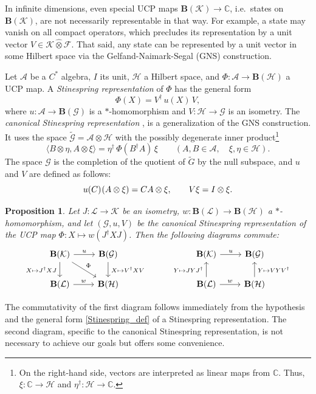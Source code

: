 \documentclass[12pt]{article}
\newcommand{\CC}{\mathbb{C}}
\newcommand{\calA}{\mathcal{A}}
\newcommand{\calF}{\mathcal{F}}
\newcommand{\calG}{\mathcal{G}}
\newcommand{\calH}{\mathcal{H}}
\newcommand{\calK}{\mathcal{K}}
\newcommand{\calL}{\mathcal{L}}
\newcommand{\ts}{\mkern1mu}
\newcommand{\hotimes}{\mathbin{\hat{\otimes}}}
\newcommand{\Bo}{\mathbf{B}}
\newcommand{\wt}{\widetilde}
\newcommand*{\braket}[2]{\langle{#1},{#2}\rangle}
\newtheorem{Proposition}[Theorem]{Proposition}
\newtheorem[definition]{Definition}[Theorem]{Definition}
\newtheorem[remark]{Example}[Theorem]{Example}
\newtheorem[remark]{Remark}[Theorem]{Remark}
\newtheorem[remark]{Question}[Theorem]{Open question}
\newtheorem*[definition]{definition}{Definition}
\newtheorem*[remark]{example}{Example}
\newtheorem*[remark]{remark}{Remark}
\newtheorem*[remark]{question}{Open question}
\numberwithin{equation}{section}
\begin{document}
In infinite dimensions, even special UCP maps $\Bo(\calK)\to\CC$, i.e.\ states on $\Bo(\calK)$, are not necessarily representable in that way. For example, a state may vanish on all compact operators, which precludes its representation by a unit vector $V\in\calK\hotimes\calF$. That said, any state can be represented by a unit vector in some Hilbert space via the Gelfand-Naimark-Segal (GNS) construction.

Let $\calA$ be a $C^*$ algebra, $I$ its unit, $\calH$ a Hilbert space, and $\Phi\colon\calA\to\Bo(\calH)$ a UCP map. A \emph{Stinespring representation} of $\Phi$ has the general form
\begin{equation}\label{Stinespring_def}
\Phi(X)=V^\dag\, u(X)\, V,
\end{equation}
where $u\colon\calA\to\Bo(\calG)$ is a $*$-homomorphism and $V\colon\calH\to\calG$ is an isometry. The \emph{canonical Stinespring representation} \cite{Sti55}, \cite[Theorem~4.1]{Paulsen} is a generalization of the GNS construction. It uses the space $\wt{\calG}=\calA\otimes\calH$ with the possibly degenerate inner product\footnote{On the right-hand side, vectors are interpreted as linear maps from $\CC$. Thus, $\xi\colon\CC\to\calH$ and $\eta^\dag\colon\calH\to\CC$.}
\begin{equation}
\braket{B\otimes\eta}{A\otimes\xi}=\eta^\dag\,\Phi(B^\dag A)\,\xi\qquad
(A,B\in\calA,\quad \xi,\eta\in\calH).
\end{equation}
The space $\calG$ is the completion of the quotient of $\wt{G}$ by the null subspace, and $u$ and $V$ are defined as follows:
\begin{equation}
u(C)\ts(A\otimes\xi)=CA\otimes\xi,\qquad V\xi=I\otimes\xi.
\end{equation}

\begin{Proposition}\label{prop_KLHG}
Let $J\colon\calL\to\calK$ be an isometry, $w\colon\Bo(\calL)\to\Bo(\calH)$ a $*$-homomorphism, and let $(\calG,u,V)$ be the canonical Stinespring representation of the UCP map $\Phi\colon X\mapsto w(J^\dag XJ)$. Then the following diagrams commute:
\begin{equation}
\begin{tikzcd}
\Bo(\calK) \arrow[d,swap,"X\mapsto J^\dag XJ\,"]
\arrow[r,"u"] \arrow[dr,"\Phi"] &
\Bo(\calG) \arrow[d,"\,X\mapsto V^\dag XV"] \\
\Bo(\calL) \arrow[r,"w"] & \Bo(\calH)
\end{tikzcd}
\qquad\quad
\begin{tikzcd}
\Bo(\calK) \arrow[d,leftarrow,swap,"Y\mapsto JYJ^\dag\,"] \arrow[r,"u"] &
\Bo(\calG) \arrow[d,leftarrow,"\,Y\mapsto VYV^\dag"] \\
\Bo(\calL) \arrow[r,"w"] & \Bo(\calH)
\end{tikzcd}
\end{equation}
\end{Proposition}
The commutativity of the first diagram follows immediately from the hypothesis and the general form \eqref{Stinespring_def} of a Stinespring representation. The second diagram, specific to the canonical Stinespring representation, is not necessary to achieve our goals but offers some convenience.
\end{document}

